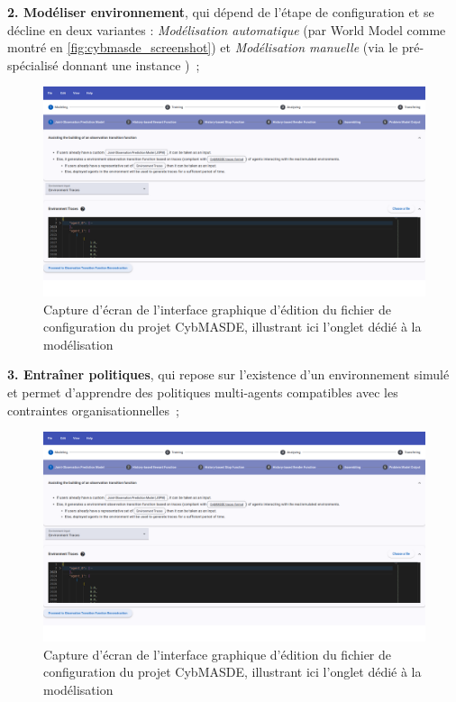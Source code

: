 \textbf{2. Modéliser environnement}, qui dépend de l’étape de configuration et se décline en deux variantes : \textit{Modélisation automatique} (par World Model comme montré en \autoref{fig:cybmasde_screenshot}) et \textit{Modélisation manuelle} (via le  pré-spécialisé donnant une instance )~;

\begin{figure}[h!]
  \centering
  \includegraphics[width=\linewidth]{figures/CybMASDE_2.png}
  \caption{Capture d'écran de l'interface graphique d'édition du fichier de configuration du projet CybMASDE, illustrant ici l'onglet dédié à la modélisation}
  \label{fig:cybmasde_screenshot_configuration}
\end{figure}

\textbf{3. Entraîner politiques}, qui repose sur l’existence d’un environnement simulé et permet d’apprendre des politiques multi-agents compatibles avec les contraintes organisationnelles~;

\begin{figure}[h!]
  \centering
  \includegraphics[width=\linewidth]{figures/CybMASDE_2.png}
  \caption{Capture d'écran de l'interface graphique d'édition du fichier de configuration du projet CybMASDE, illustrant ici l'onglet dédié à la modélisation}
  \label{fig:cybmasde_screenshot}
\end{figure}

